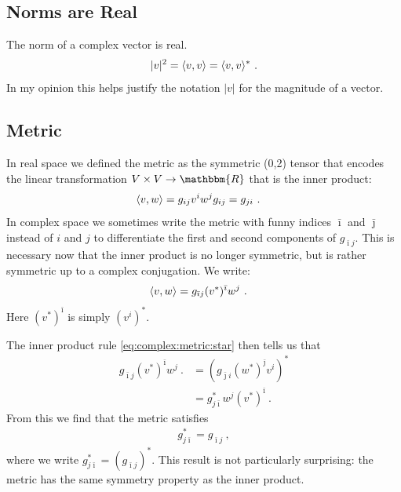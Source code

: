 \subsection{Norms are Real}
The norm of a complex vector is real. 
\begin{align}
    |v|^2 = \langle v, v \rangle = \langle v, v \rangle^* \ .
\end{align}
In my opinion this helps justify the notation $|v|$ for the magnitude of a vector.


\subsection{Metric}
In real space we defined the metric as the symmetric (0,2) tensor that encodes the linear transformation $V\times V \to \mathbbm{R}$ that is the inner product:
\begin{align}
    \langle v , w \rangle = g_{ij}v^i w^j 
    &
    g_{ij} = g_{ji}
    \ .
\end{align}
In complex space we sometimes write the metric with funny indices $\bar{\imath}$ and $\bar{\jmath}$ instead of $i$ and $j$ to differentiate the first and second components of $g_{\bar{\imath}j}$. This is necessary now that the inner product is no longer symmetric, but is rather symmetric up to a complex conjugation. We write:
\begin{align}
    \langle v, w \rangle &= g_{\bar{\imath}j}(v^*)^{\bar{\imath}}w^j \ .
\end{align}
Here $(v^*)^{\bar{\imath}}$ is simply $(v^i)^*$.

The inner product rule \eqref{eq:complex:metric:star} then tells us that
\begin{align}
    g_{\bar{\imath}j}(v^*)^{\bar{\imath}}w^j \ .
    &= 
    \left(
        g_{\bar{\jmath}i}
        (w^*)^{\bar{\jmath}}
        v^i
        \right)^*
    \\
    &= 
    g_{j\bar{\imath}}^* w^j(v^*)^{\bar{\imath}}
     \ .
\end{align}
From this we find that the metric satisfies
\begin{align}
g_{j\bar{\imath}}^* =
    g_{\bar{\imath}j} \ ,
\end{align}
where we write $g_{j\bar{\imath}}^* = (g_{\bar\imath j})^*$.  This result is not particularly surprising: the metric has the same symmetry property as the inner product. 



